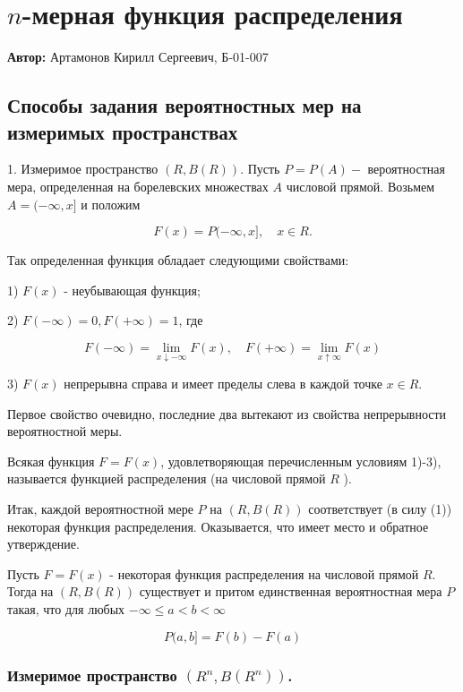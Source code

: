 
\section{$n$-мерная функция распределения}

\textbf{Автор:} Артамонов Кирилл Сергеевич, Б-01-007

\subsection{Способы задания вероятностных мер на измеримых пространствах}
\label{par_3}

1. Измеримое пространство $(R, {B}(R))$. Пусть ${P}={P}(A)-$ вероятностная мера, определенная на борелевских множествах $A$ числовой прямой. Возьмем $A=(-\infty, x]$ и положим

$$
F(x)={P}(-\infty, x], \quad x \in R .
$$

Так определенная функция обладает следующими свойствами:

1) $F(x)$ - неубывающая функция;

2) $F(-\infty)=0, F(+\infty)=1$, где

$$
F(-\infty)=\lim _{x \downarrow-\infty} F(x), \quad F(+\infty)=\lim _{x \uparrow \infty} F(x)
$$

3) $F(x)$ непрерывна справа и имеет пределы слева в каждой точке $x \in R$.

Первое свойство очевидно, последние два вытекают из свойства непрерывности вероятностной меры.

\begin{definition}\label{def_1_par_3}
Всякая функция $F=F(x)$, удовлетворяющая перечисленным условиям 1)-3), называется функцией распределения (на числовой прямой $R$ ).
\end{definition}

Итак, каждой вероятностной мере ${P}$ на $(R, {B}(R))$ соответствует (в силу (1)) некоторая функция распределения. Оказывается, что имеет место и обратное утверждение. 

\begin{theorem}\label{theo_1_par_3}
Пусть $F=F(x)$ - некоторая функция распределения на числовой прямой $R$. Тогда на $(R, {B}(R))$ существует и притом единственная вероятностная мера ${P}$ такая, что для любых $-\infty \leqslant a<b<\infty$

$$
{P}(a, b]=F(b)-F(a)
$$
\end{theorem}

\subsubsection{Измеримое пространство $\left(R^{n}, {B}\left(R^{n}\right)\right)$.}

